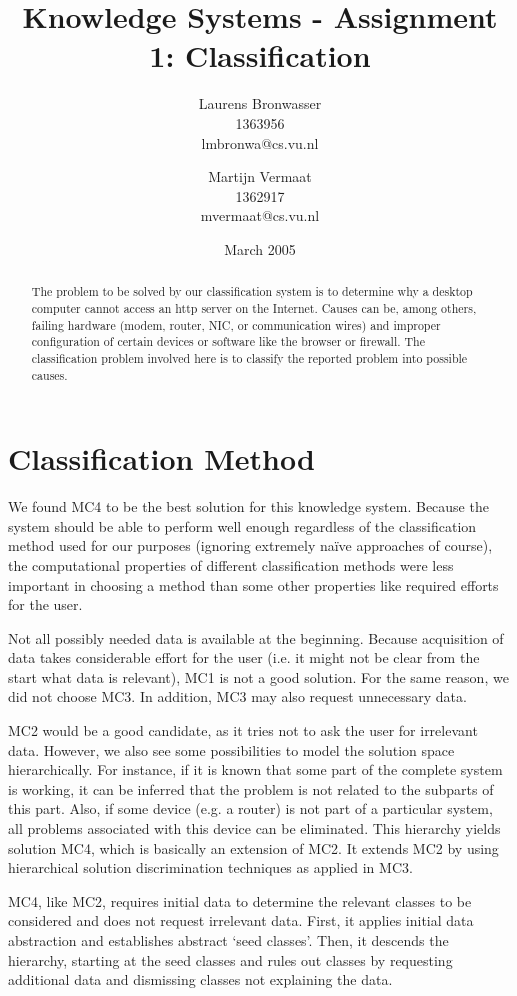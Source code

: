 \documentclass[a4paper,11pt]{article}
\title{Knowledge Systems - Assignment 1: Classification}
\author{Laurens Bronwasser\\
1363956\\
lmbronwa@cs.vu.nl
\and
Martijn Vermaat\\
1362917\\
mvermaat@cs.vu.nl}
\date{March 2005}
\begin{document}
\maketitle


\renewcommand{\abstractname}{Introduction}
\begin{abstract}
  The problem to be solved by our classification system is to determine why a
  desktop computer cannot access an http server on the Internet. Causes can
  be, among others, failing hardware (modem, router, NIC, or communication
  wires) and improper configuration of certain devices or software like the
  browser or firewall. The classification problem involved here is to
  classify the reported problem into possible causes.
\end{abstract}


\section*{Classification Method}

We found MC4 to be the best solution for this knowledge system. Because the
system should be able to perform well enough regardless of the classification
method used for our purposes (ignoring extremely na\"ive approaches of
course), the computational properties of different classification methods were
less important in choosing a method than some other properties like required
efforts for the user.

Not all possibly needed data is available at the beginning. Because
acquisition of data takes considerable effort for the user (i.e. it might not
be clear from the start what data is relevant), MC1 is not a good
solution. For the same reason, we did not choose MC3. In addition, MC3 may
also request unnecessary data.

MC2 would be a good candidate, as it tries not to ask the user for irrelevant
data. However, we also see some possibilities to model the solution space
hierarchically. For instance, if it is known that some part of the complete
system is working, it can be inferred that the problem is not related to the
subparts of this part. Also, if some device (e.g. a router) is not part of a
particular system, all problems associated with this device can be
eliminated. This hierarchy yields solution MC4, which is basically an
extension of MC2. It extends MC2 by using hierarchical solution discrimination
techniques as applied in MC3.

MC4, like MC2, requires initial data to determine the relevant classes to be
considered and does not request irrelevant data. First, it applies initial data
abstraction and establishes abstract `seed classes'. Then, it descends the
hierarchy, starting at the seed classes and rules out classes by requesting
additional data and dismissing classes not explaining the data.
\end{document}
